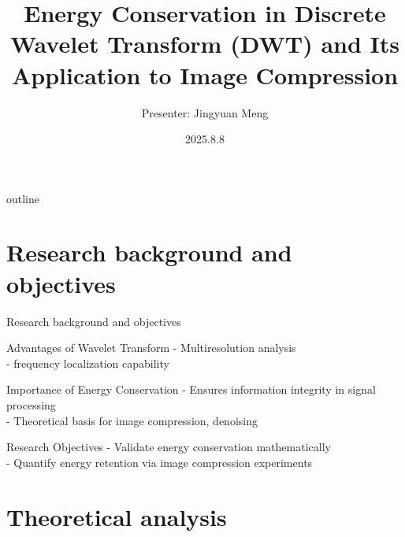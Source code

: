 \documentclass[11pt]{beamer}
\author[Autor]{Presenter:  Jingyuan Meng}
\title{Energy Conservation in Discrete Wavelet Transform (DWT) and Its Application to Image Compression}
\date{2025.8.8}
\begin{document}
\begin{frame}
\titlepage
\end{frame}

\begin{frame}{outline}
\tableofcontents 
\end{frame}

\section{Research background and objectives}

\begin{frame}{Research background and objectives}
 \begin{block}{Advantages of Wavelet Transform}
    - Multiresolution analysis \\
    - frequency localization capability
    \end{block}
    
    \begin{block}{Importance of Energy Conservation}
    - Ensures information integrity in signal processing  \\
  - Theoretical basis for image compression, denoising
    \end{block}
    
    \begin{block}{Research Objectives}
    - Validate energy conservation mathematically  \\
  - Quantify energy retention via image compression experiments  
    \end{block}
\end{frame}

\section{Theoretical analysis}
\end{document}
